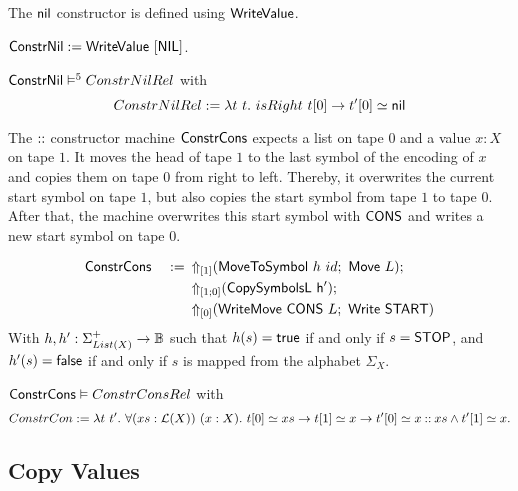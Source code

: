 The $\nil$ constructor is defined using $\MS{WriteValue}$.
\begin{definition}[$\MS{ConstrNil}$]
  $\MS{ConstrNil} := \MS{WriteValue}~[\MS{NIL}]$.
\end{definition}
\begin{lemma}
  $\MS{ConstrNil} \RealiseIn{5} ConstrNilRel$ with
  \[
    ConstrNilRel := \lambda t~t.~isRight~t[0] \rightarrow t'[0] \simeq \nil
  \]
\end{lemma}

The $\cons$ constructor machine $\MS{ConstrCons}$ expects a list on tape $0$ and a value $x:X$ on tape $1$.  It moves the head of tape $1$ to the last
symbol of the encoding of $x$ and copies them on tape $0$ from right to left.  Thereby, it overwrites the current start symbol on tape $1$, but also
copies the start symbol from tape $1$ to tape $0$.  After that, the machine overwrites this start symbol with $\MS{CONS}$ and writes a new start
symbol on tape $0$.

\begin{definition}[$\MS{ConstrCons}$]
  \label{def:Constr_cons}
  \begin{alignat*}{2}
    &\MS{ConstrCons}&~:=~& \LiftTapes{(\MS{MoveToSymbol}~h~id \Seq \MS{Move}~L)}{\Vector{1}} \Seq \\
    &               &    & \LiftTapes{(\MS{CopySymbolsL~h'})}{\Vector{1;0}} \Seq \\
    &               &    & \LiftTapes{(\MS{WriteMove}~\MS{CONS}~L \Seq \MS{Write}~\MS{START})}{\Vector{0}}
  \end{alignat*}
  With $h, h' : \Sigma_{List(X)}^+ \to \Bool$ such that $h(s)=\true$ if and only if $s=\MS{STOP}$, and $h'(s)=\false$ if and only if $s$ is mapped
  from the alphabet $\Sigma_X$.
\end{definition}

\begin{lemma}
  \label{lem:Constr_cons_Realise}
  $\MS{ConstrCons} \Realise ConstrConsRel$ with
  \[
    ConstrCon := \lambda t~t'.~\forall (xs:\List(X))~(x:X).~t[0] \simeq xs \rightarrow t[1] \simeq x \rightarrow t'[0] \simeq x \cons xs \land t'[1]
    \simeq x.
  \]
\end{lemma}


\subsection{Copy Values}
\label{sec:copy}


